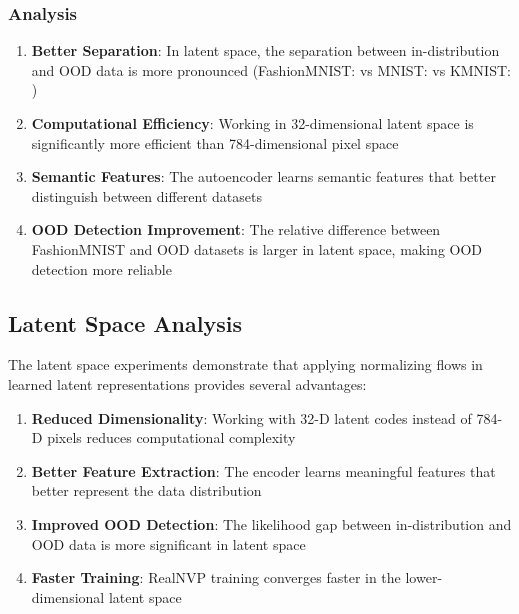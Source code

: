 \documentclass[conference,12pt]{IEEEtran}
\begin{document}
\subsubsection{Analysis}

\begin{enumerate}
    \item \textbf{Better Separation}: In latent space, the separation between in-distribution and OOD data is more pronounced (FashionMNIST: \LatentTestLL{} vs MNIST: \LatentMNISTLL{} vs KMNIST: \LatentKMNISTLL)
    
    \item \textbf{Computational Efficiency}: Working in 32-dimensional latent space is significantly more efficient than 784-dimensional pixel space
    
    \item \textbf{Semantic Features}: The autoencoder learns semantic features that better distinguish between different datasets
    
    \item \textbf{OOD Detection Improvement}: The relative difference between FashionMNIST and OOD datasets is larger in latent space, making OOD detection more reliable
\end{enumerate}

\subsection{Latent Space Analysis}

The latent space experiments demonstrate that applying normalizing flows in learned latent representations provides several advantages:

\begin{enumerate}
    \item \textbf{Reduced Dimensionality}: Working with 32-D latent codes instead of 784-D pixels reduces computational complexity
    
    \item \textbf{Better Feature Extraction}: The encoder learns meaningful features that better represent the data distribution
    
    \item \textbf{Improved OOD Detection}: The likelihood gap between in-distribution and OOD data is more significant in latent space
    
    \item \textbf{Faster Training}: RealNVP training converges faster in the lower-dimensional latent space
\end{enumerate}
\end{document}
